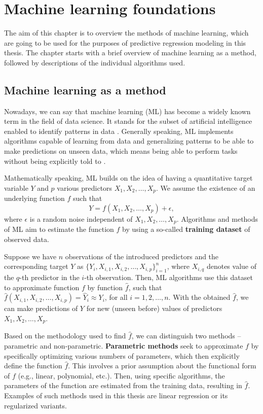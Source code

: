 \chapter{Machine learning foundations}
\label{chap:1}
The aim of this chapter is to overview the methods of machine learning, which
are going to be used for the purposes of predictive regression modeling in 
this thesis. The chapter starts with a brief overview of machine learning as
a method, followed by descriptions of the individual algorithms used.

\section{Machine learning as a method}

Nowadays, we can say that machine learning (ML) has become a widely known term in
the field of data science. It stands for the subset of artificial intelligence enabled to identify patterns in data \cite{ibm}.
Generally speaking, ML implements algorithms capable of learning from data and generalizing patterns to be able to make predictions on unseen data,
which means being able to perform tasks without being explicitly told to \cite{islp}.      

Mathematically speaking, ML builds on the idea of having a quantitative target variable $Y$ and $p$ various
predictors $X_1, X_2, \ldots, X_p$. We assume the existence of an underlying function $f$ such that
\begin{equation}
Y = f(X_1, X_2, \ldots, X_p) + \epsilon,
\end{equation}
where $\epsilon$ is a random noise independent of $X_1, X_2, \ldots, X_p$. Algorithms and methods of ML 
aim to estimate the function $f$ by using a so-called \textbf{training dataset} of observed data. 

Suppose we have $n$ observations of the introduced predictors and the corresponding target $Y$ as $\{ Y_i, X_{i, 1}, X_{i, 2}, \ldots, X_{i, p} \}_{i=1}^{n}$, where $X_{i, q}$ denotes value of the $q$-th predictor in the $i$-th observation.
Then, ML algorithms use this dataset to approximate function $f$ by function $\hat{f}$, such that $\hat{f}(X_{i, 1}, X_{i, 2}, \ldots, X_{i, p}) = \hat{Y}_i \approx Y_i$, for all $i=1, 2, \ldots, n$. With the obtained $\hat{f}$, we can make predictions of $Y$ for new (unseen before) values of predictors $X_1, X_2, \ldots, X_p$.
\newline
\par
Based on the methodology used to find $\hat{f}$, we can distinguish two methods – parametric and non-parametric. 
\textbf{Parametric methods} seek to approximate $f$ by specifically optimizing various numbers of parameters, which then explicitly define the function $\hat{f}$. This involves a prior assumption
about the functional form of $f$ (e.g., linear, polynomial, etc.). Then, using specific algorithms, the parameters of the function are estimated from the training data, resulting in $\hat{f}$. Examples of
such methods used in this thesis are linear regression or its regularized variants. 

